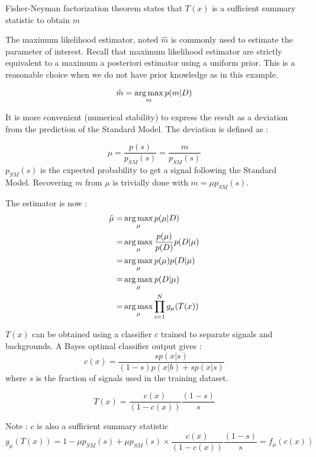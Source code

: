 Fisher-Neyman factorization theorem states that $T(x)$ is a sufficient summary statistic to obtain $m$

The maximum likelihood estimator, noted $\hat m$ is commonly used to estimate the parameter of interest.
Recall that maximum likelihood estimator are strictly equivalent to a maximum a posteriori estimator using a uniform prior.
This is a reasonable choice when we do not have prior knowledge as in this example.

\begin{equation}
	\hat m = \operatorname*{arg\,max}_m p(m | D)
\end{equation}

It is more convenient (numerical stability) to express the result as a deviation from the prediction of the Standard Model.
The deviation is defined as :

\begin{equation}
	\mu = \frac{p(s)}{p_{SM}(s)} = \frac{m}{p_{SM}(s)}
\end{equation}
$p_{SM}(s)$ is the expected probability to get a signal following the Standard Model.
Recovering $m$ from $\mu$ is trivially done with $m = \mu p_{SM}(s)$.

The estimator is now :
\begin{align}
	\hat\mu =& \operatorname*{arg\,max}_\mu p(\mu | D) \\
	     =& \operatorname*{arg\,max}_\mu \frac{p(\mu)}{p(D)} p(D | \mu) \\
	     =& \operatorname*{arg\,max}_\mu p(\mu) p(D | \mu) \\
	     =& \operatorname*{arg\,max}_\mu  p(D | \mu) \\
	     =& \operatorname*{arg\,max}_\mu  \prod_{i=1}^N g_\mu(T(x)) \\
\end{align}


$T(x)$ can be obtained using a classifier $c$ trained to separate signals and backgrounds.
A Bayes optimal classifier output gives :
\begin{equation}
	c(x) = \frac{s p(x|s)}{(1-s) p(x|b) + s p(x|s)}
\end{equation}
where $s$ is the fraction of signals used in the training dataset.

\begin{equation}
	T(x) = \frac{c(x)}{(1-c(x))} \frac{(1-s)}{s} 
\end{equation}


Note : $c$ is also a sufficient summary statistic
\begin{equation}
	g_\mu(T(x)) = 1 - \mu p_{SM}(s) + \mu p_{SM}(s) \times \frac{c(x)}{(1-c(x))} \frac{(1-s)}{s} = f_\mu(c(x))
\end{equation}

